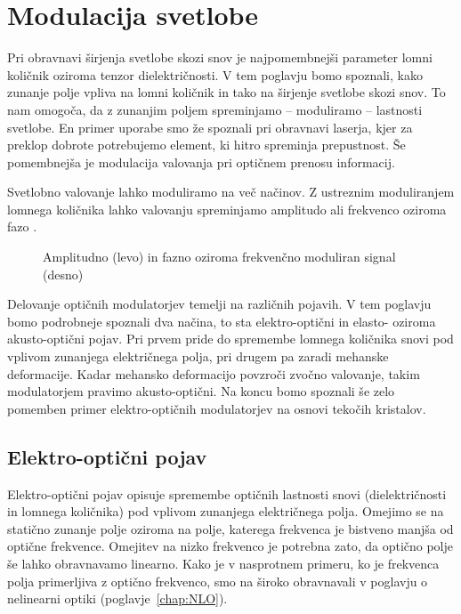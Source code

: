 
\chapter{Modulacija svetlobe}

Pri obravnavi širjenja svetlobe skozi snov je najpomembnejši parameter lomni količnik
oziroma tenzor dielektričnosti. V tem poglavju bomo spoznali, kako zunanje polje vpliva 
na lomni količnik in tako na širjenje svetlobe skozi snov. To nam omogoča,
da z zunanjim poljem spreminjamo -- moduliramo -- lastnosti svetlobe. En primer uporabe smo že spoznali pri 
obravnavi laserja, kjer za preklop dobrote potrebujemo element, ki hitro spreminja 
prepustnost. Še pomembnejša je modulacija valovanja pri optičnem prenosu informacij.

Svetlobno valovanje lahko moduliramo na več načinov. Z ustreznim moduliranjem
lomnega količnika lahko valovanju spreminjamo amplitudo 
ali frekvenco oziroma fazo
. 
\begin{figure}[h]
\centering
\def\svgwidth{140truemm} 

\caption{Amplitudno (levo) in fazno oziroma frekvenčno moduliran signal (desno)
}
\label{fig:amfm}
\end{figure}

Delovanje optičnih modulatorjev temelji na različnih pojavih. V tem poglavju bomo 
podrobneje spoznali dva načina, to sta elektro-optični in elasto- oziroma akusto-optični pojav. 
Pri prvem pride do spremembe lomnega količnika snovi pod vplivom zunanjega električnega polja, 
pri drugem pa zaradi mehanske deformacije. Kadar mehansko deformacijo povzroči zvočno valovanje, 
takim modulatorjem pravimo akusto-optični. Na koncu bomo spoznali še zelo pomemben 
primer elektro-optičnih modulatorjev na osnovi tekočih kristalov.

\section{Elektro-optični pojav}
Elektro-optični pojav opisuje spremembe optičnih lastnosti 
snovi (dielektričnosti in lomnega količnika) pod vplivom zunanjega električnega polja. 
Omejimo se na statično zunanje polje oziroma
na polje, katerega frekvenca je bistveno manjša od optične frekvence. Omejitev na nizko 
frekvenco je potrebna zato, da optično polje še lahko obravnavamo linearno. 
Kako je v nasprotnem primeru, ko je frekvenca polja primerljiva z optično frekvenco, 
smo na široko obravnavali v poglavju o nelinearni optiki (poglavje~\ref{chap:NLO}).


